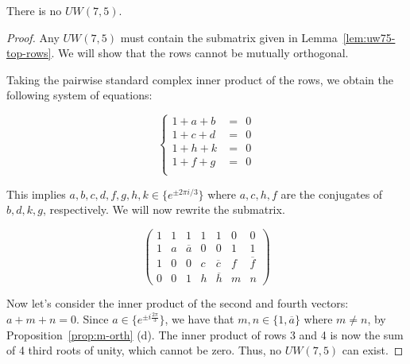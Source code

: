 \begin{theorem} \label{th:uw75-exist}
 There is no $UW(7,5)$.

\begin{proof}
Any $UW(7,5)$ must contain the submatrix given in Lemma~\ref{lem:uw75-top-rows}. We will show that the rows cannot be mutually orthogonal.

Taking the pairwise standard complex inner product of the rows, we obtain the following system of equations:

$$
\begin{cases}
 1+a+b &= ~~0 \\
 1+c+d &= ~~0 \\
 1+h+k &= ~~0 \\
 1+f+g &= ~~0 \\
\end{cases}
$$

This implies $a,b,c,d,f,g,h,k\in\{e^{\pm 2\pi i / {3}}\}$ where $a,c,h,f$ are the conjugates of $b,d,k,g$, respectively. We will now rewrite the submatrix.

$$
\left(
\begin{array}{ccccccc}
 1& 1& 1& 1& 1& 0& 0 \\
 1& a& \overline{a}& 0& 0& 1& 1 \\
 1& 0& 0& c& \overline{c}& f& \overline{f} \\
 0& 0& 1& h& \overline{h}& m& n
\end{array}
\right)
$$

Now let's consider the inner product of the second and fourth vectors: $a+m+n=0$. Since $a\in\{e^{\pm i\frac{2\pi}{3}}\}$, we have that $m,n \in \{1,\overline{a}\}$ where $m \neq n$, by Proposition~\ref{prop:m-orth} (d). The inner product of rows 3 and 4 is now the sum of 4 third roots of unity, which cannot be zero. Thus, no $UW(7,5)$ can exist.

\end{proof}
\end{theorem}

